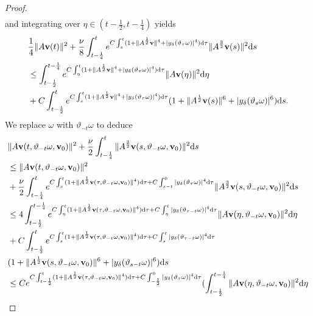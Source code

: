\documentclass{elsarticle}
\theoremstyle{definition}
\numberwithin{equation}{section}
\renewcommand{\d}{{\rm{d}}}
\begin{document}
\begin{proof}
\begin{align*}
\end{align*}
and integrating over $\eta\in(t-\frac{1}{2},t-\frac{1}{4})$ yields
\begin{align}
&\frac{1}{4}\|A\textbf{v}(t)\|^2+\frac{\nu}{8}\int_{t-\frac{1}{4}}^te^{C\int_s^t(1+\|A^\frac12\textbf{v}\|^4+
|y_\delta(\vartheta_\tau\omega)|^4)\d\tau}
\|A^\frac{3}{2}\textbf{v}(s)\|^2 \d s\nonumber\\
&\leq
\int_{t-\frac{1}{2}}^{t-\frac{1}{4}}e^{C\int_\eta^t(1+\|A^\frac12\textbf{v}\|^4+|y_\delta(\vartheta_\tau\omega)|^4)\d\tau}
\|A\textbf{v}(\eta)\|^2\d \eta\nonumber\\
&+C\int_{t-\frac{1}{2}}^te^{C\int_s^t(1+\|A^\frac12\textbf{v}\|^4+|y_\delta(\vartheta_\tau\omega)|^4)\d\tau}
(1+\|A^\frac{1}{2}\textbf{v}(s)\|^6+|y_\delta(\vartheta_s\omega)|^6)\d s.
\end{align}
We replace $\omega$ with $\vartheta_{-t}\omega$ to deduce
\begin{align}\label{6.6}
&\|A\textbf{v}(t,\vartheta_{-t}\omega,\textbf{v}_0)\|^2+\frac{\nu}{2}\int_{t-\frac{1}{4}}^t
\|A^\frac{3}{2}\textbf{v}(s,\vartheta_{-t}\omega,\textbf{v}_0)\|^2 \d s\nonumber\\
&\leq\|A\textbf{v}(t,\vartheta_{-t}\omega,\textbf{v}_0)\|^2\nonumber\\
&+\frac{\nu}{2}\int_{t-\frac{1}{4}}^te^{C\int_s^t(1+\|A^\frac12\textbf{v}(\tau,\vartheta_{-t}\omega,\textbf{v}_0)\|^4)\d\tau+
C\int_{s-t}^0|y_\delta(\vartheta_\tau\omega)|^4\d\tau}
\|A^\frac{3}{2}\textbf{v}(s,\vartheta_{-t}\omega,\textbf{v}_0)\|^2 \d s\nonumber\\
&\leq
4\int_{t-\frac{1}{2}}^{t-\frac{1}{4}}e^{C\int_\eta^t(1+\|A^\frac12\textbf{v}(\tau,\vartheta_{-t}\omega,\textbf{v}_0)\|^4)\d\tau
+C\int_\eta^t|y_\delta(\vartheta_{\tau-t}\omega)|^4\d\tau}
\|A\textbf{v}(\eta,\vartheta_{-t}\omega,\textbf{v}_0)\|^2\d \eta\nonumber\\
&+C\int_{t-\frac{1}{2}}^te^{C\int_s^t(1+\|A^\frac12\textbf{v}(\tau,\vartheta_{-t}\omega,\textbf{v}_0)\|^4)\d\tau
+C\int_s^t|y_\delta(\vartheta_{\tau-t}\omega)|^4\d\tau}\nonumber\\
&(1+\|A^\frac{1}{2}\textbf{v}(s,\vartheta_{-t}\omega,\textbf{v}_0)\|^6+|y_\delta(\vartheta_{s-t}\omega)|^6)\d s\nonumber\\
&\leq Ce^{C\int_{t-\frac12}^t(1+\|A^\frac12\textbf{v}(\tau,\vartheta_{-t}\omega,\textbf{v}_0)\|^4)\d\tau
+C\int_{-\frac12}^0|y_\delta(\vartheta_{\tau}\omega)|^4\d\tau}
(\int_{t-\frac{1}{2}}^{t-\frac{1}{4}}\|A\textbf{v}(\eta,\vartheta_{-t}\omega,\textbf{v}_0)\|^2\d \eta\nonumber\\

\end{align}
\end{proof}
\end{document}
